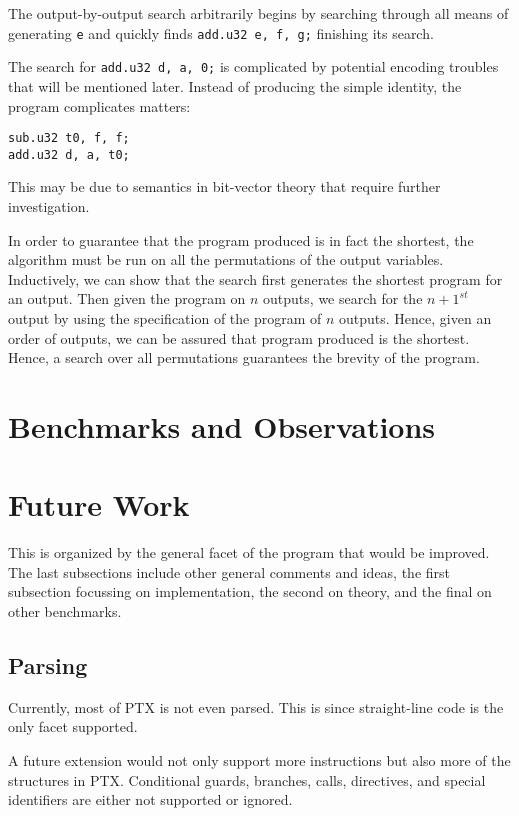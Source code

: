 \documentclass[letterpaper,twocolumn,10pt]{article}
\begin{document}
The output-by-output search arbitrarily begins by searching through
all means of generating \texttt{e} and quickly finds \texttt{add.u32 e, f, g;}
finishing its search.

The search for \texttt{add.u32 d, a, 0;} is complicated by potential encoding
troubles that will be mentioned later. Instead of producing the simple
identity, the program complicates matters:
\begin{lstlisting}
sub.u32 t0, f, f;
add.u32 d, a, t0;
\end{lstlisting}
This may be due to semantics in bit-vector theory that require
further investigation.

In order to guarantee that the program produced is in fact the shortest,
the algorithm must be run on all the permutations of the output variables.
Inductively, we can show that the search first generates the shortest
program for an output. Then given the program on $n$ outputs, we search
for the $n + 1^{st}$ output by using the specification of the program of
$n$ outputs. Hence, given an order of outputs, we can be assured that program
produced is the shortest. Hence, a search over all permutations guarantees the
brevity of the program.

\section{Benchmarks and Observations}



\section{Future Work}

This is organized by the general facet of the program that would be improved.
The last subsections include other general comments and ideas, the first subsection
focussing on implementation, the second on theory, and the final on other benchmarks.

\subsection{Parsing}

Currently, most of PTX is not even parsed. This is since straight-line
code is the only facet supported.

A future extension would not only support more instructions but also more
of the structures in PTX. Conditional guards, branches, calls, directives,
and special identifiers are either not supported or ignored.
\end{document}
